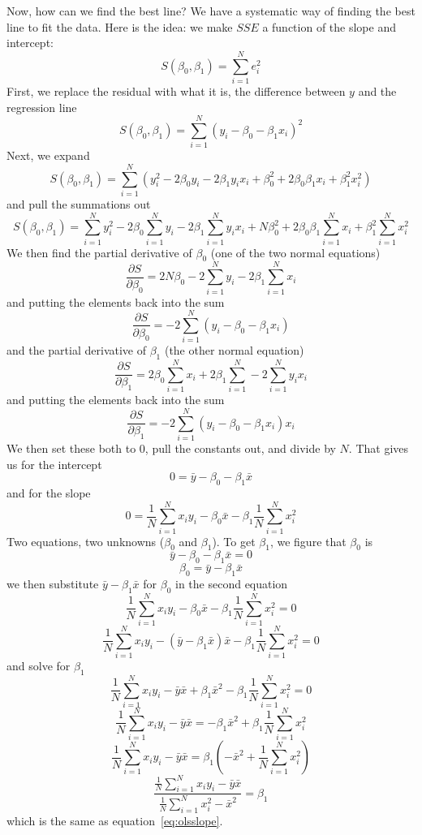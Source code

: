 Now, how can we find the best line? We have a systematic way of finding the best line to fit the data. Here is the idea: we make $SSE$ a function of the slope and intercept:
\[
S\left(\beta_0,\beta_1\right)=\sum_{i=1}^Ne_i^2
\]
First, we replace the residual with what it is, the difference between $y$ and the regression line
\[
S\left(\beta_0,\beta_1\right)=\sum_{i=1}^N\left(y_i-\beta_0-\beta_1x_i\right)^2
\]
Next, we expand
\[
S\left(\beta_0,\beta_1\right)=\sum_{i=1}^N\left(y_i^2-2\beta_0y_i-2\beta_1y_ix_i+\beta_0^2+2\beta_0\beta_1x_i+\beta_1^2x_i^2\right)
\]
and pull the summations out
\[
S\left(\beta_0,\beta_1\right)=\sum_{i=1}^Ny_i^2-2\beta_0\sum_{i=1}^Ny_i-2\beta_1\sum_{i=1}^Ny_ix_i+N\beta_0^2+2\beta_0\beta_1\sum_{i=1}^Nx_i+\beta_1^2\sum_{i=1}^Nx_i^2
\]
We then find the partial derivative of $\beta_0$ (one of the two normal equations)
\[
\frac{\partial S}{\partial \beta_0}=2N\beta_0-2\sum_{i=1}^Ny_i-2\beta_1\sum_{i=1}^Nx_i
\]
and putting the elements back into the sum
\begin{equation}
\frac{\partial S}{\partial \beta_0}=-2\sum_{i=1}^N\left(y_i-\beta_0-\beta_1x_i\right)
\end{equation}
and the partial derivative of $\beta_1$ (the other normal equation)
\[
\frac{\partial S}{\partial \beta_1}=2\beta_0\sum_{i=1}^Nx_i+2\beta_1\sum_{i=1}^N-2\sum_{i=1}^Ny_ix_i
\]
and putting the elements back into the sum
\begin{equation}
\frac{\partial S}{\partial \beta_1}=-2\sum_{i=1}^N\left(y_i-\beta_0-\beta_1x_i\right)x_i
\end{equation}
We then set these both to 0, pull the constants out, and divide by $N$. That gives us for the intercept
\[
0=\bar{y}-\beta_0-\beta_1\bar{x}
\]
and for the slope
\[
0=\frac{1}{N}\sum_{i=1}^Nx_iy_i-\beta_0\bar{x}-\beta_1\frac{1}{N}\sum_{i=1}^Nx_i^2
\]
Two equations, two unknowns ($\beta_0$ and $\beta_1$). To get $\beta_1$, we figure that $\beta_0$ is
\[
\bar{y}-\beta_0-\beta_1\bar{x}=0
\]
\[
\beta_0=\bar{y}-\beta_1\bar{x}
\]
we then substitute $\bar{y}-\beta_1\bar{x}$ for $\beta_0$ in the second equation
\[
\frac{1}{N}\sum_{i=1}^Nx_iy_i-\beta_0\bar{x}-\beta_1\frac{1}{N}\sum_{i=1}^Nx_i^2 = 0
\]
\[
\frac{1}{N}\sum_{i=1}^Nx_iy_i-\left(\bar{y}-\beta_1\bar{x}\right)\bar{x}-\beta_1\frac{1}{N}\sum_{i=1}^Nx_i^2 = 0
\]
and solve for $\beta_1$
\[
\frac{1}{N}\sum_{i=1}^Nx_iy_i-\bar{y}\bar{x}+\beta_1\bar{x}^2-\beta_1\frac{1}{N}\sum_{i=1}^Nx_i^2 = 0
\]
\[
\frac{1}{N}\sum_{i=1}^Nx_iy_i-\bar{y}\bar{x} = -\beta_1\bar{x}^2+\beta_1\frac{1}{N}\sum_{i=1}^Nx_i^2
\]
\[
\frac{1}{N}\sum_{i=1}^Nx_iy_i-\bar{y}\bar{x} = \beta_1\left(-\bar{x}^2+\frac{1}{N}\sum_{i=1}^Nx_i^2\right)
\]
\[
\frac{\frac{1}{N}\sum_{i=1}^Nx_iy_i-\bar{y}\bar{x}}{\frac{1}{N}\sum_{i=1}^Nx_i^2-\bar{x}^2} = \beta_1
\]
which is the same as equation~\eqref{eq:olsslope}.

